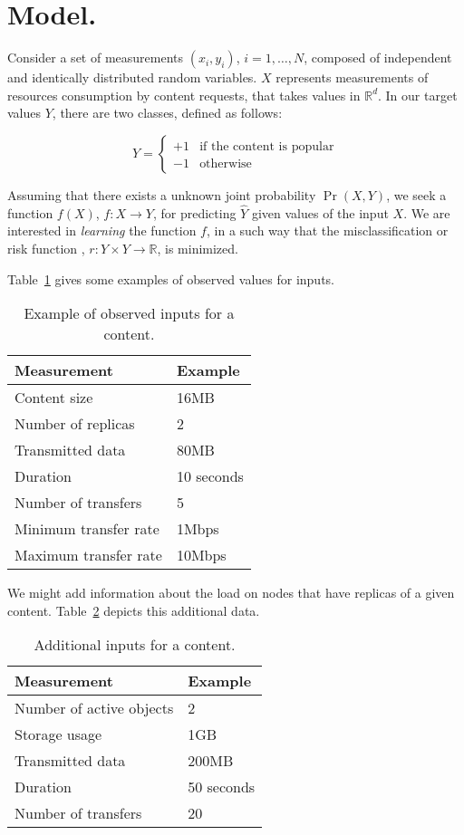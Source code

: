 	\section{Model.}

		Consider a set of measurements $(x_i,y_i)$, $i = 1,\dots ,N$, composed
		of independent and identically distributed random variables. $X$ represents 
		measurements of resources consumption
		by content requests, that takes values in $\mathbb{R}^d$. In our target 
		values $Y$, there are two classes, defined as follows:

		\[
			Y = \begin{cases}
        								+1  & \mbox{if the content is popular} \\
       								-1   & \mbox{otherwise}
        						\end{cases}
		\]

		Assuming that there exists a unknown joint probability $\operatorname{Pr}(X,Y)$, 
		we seek a function $f(X)$, $f : X \rightarrow Y$, for predicting $\hat{Y}$ 
		given values of the input $X$. We are interested in \emph{learning} 
		the function $f$, in a such way that the misclassification or risk function ,
		$r : Y \times Y \rightarrow \mathbb{R}$, is minimized.

      Table~\ref{table1} gives some examples of observed 
		values for inputs. 

		\begin{table}[h]
			\centering
			\begin{tabular}{ll}
				\hline
				Measurement & Example \\
				\hline
				Content size & 16MB \\
				Number of replicas & 2 \\
				Transmitted data &  80MB \\
				Duration &  10 seconds \\
				Number of transfers &  5 \\
				Minimum transfer rate &  1Mbps \\
				Maximum transfer rate &  10Mbps \\
				\hline
			\end{tabular}
			\caption{Example of observed inputs for a content.}
			\label{table1}
		\end{table}


		We might add information about the load
		on nodes that have replicas of a given content. Table~\ref{table2} 
depicts this additional data.


		\begin{table}[h]
			\centering
			\begin{tabular}{ll}
				\hline
				Measurement & Example \\
				\hline
				Number of active objects & 2 \\
				Storage usage & 1GB \\
				Transmitted data &  200MB \\
				Duration &  50 seconds \\
				Number of transfers &  20 \\
				\hline
			\end{tabular}
			\caption{Additional inputs for a content.}
			\label{table2}
		\end{table}
		